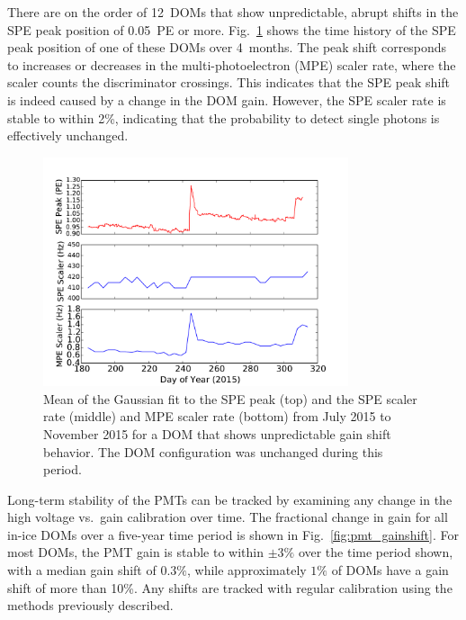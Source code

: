 There are on the order of 12~DOMs that show unpredictable, abrupt shifts in the SPE peak
position of 0.05~PE or more. Fig.~\ref{fig:gainshift_spe} shows the time history of the
SPE peak position of one of these DOMs over 4~months. The peak shift
corresponds to increases or decreases in the multi-photoelectron (MPE)
scaler rate, where the scaler counts the discriminator crossings.  This
indicates that the SPE peak shift is indeed caused by a change in the DOM
gain. However, the SPE scaler rate is stable to within 2\%, indicating that the
probability to detect single photons is effectively unchanged.

\begin{figure}[!h]
 \centering
 \includegraphics[width=0.8\textwidth]{graphics/dom/reliability/gainshift.pdf}
 \caption{Mean of the Gaussian fit to the SPE peak (top) and the SPE
   scaler rate (middle) and MPE
   scaler rate (bottom) from July 2015 to November 2015 for a DOM
   that shows unpredictable gain shift behavior. The DOM
   configuration was unchanged during this period.}
 \label{fig:gainshift_spe}
\end{figure}

Long-term stability of the PMTs can be tracked by examining any change in
the high voltage vs.~gain calibration over time.  The fractional change in gain for
all in-ice DOMs over a five-year time period is shown in
Fig.~\ref{fig:pmt_gainshift}.  For most DOMs, the PMT gain is stable to
within $\pm3\%$ over the time period shown, with a median gain shift of $0.3\%$, while approximately $1\%$ 
of DOMs have a gain shift of more than 10\%.  Any shifts are tracked with
regular calibration using the methods previously described.

